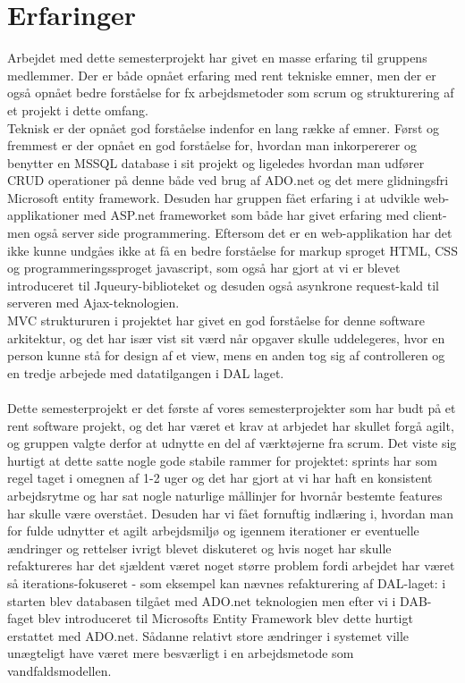 \section{Erfaringer}
Arbejdet med dette semesterprojekt har givet en masse erfaring til gruppens medlemmer. Der er både opnået erfaring med rent tekniske emner, men der er også opnået bedre forståelse for fx arbejdsmetoder som scrum og strukturering af et projekt i dette omfang.\\
Teknisk er der opnået god forståelse indenfor en lang række af emner. Først og fremmest er der opnået en god forståelse for, hvordan man inkorpererer og benytter en MSSQL database i sit projekt og ligeledes hvordan man udfører CRUD operationer på denne både ved brug af ADO.net og det mere glidningsfri Microsoft entity framework. Desuden har gruppen fået erfaring i at udvikle web-applikationer med ASP.net frameworket som både har givet erfaring med client- men også server side programmering. Eftersom det er en web-applikation har det ikke kunne undgåes ikke at få en bedre forståelse for markup sproget HTML, CSS og programmeringssproget javascript, som også har gjort at vi er blevet introduceret til Jqueury-biblioteket og desuden også asynkrone request-kald til serveren med Ajax-teknologien.\\
MVC struktururen i projektet har givet en god forståelse for denne software arkitektur, og det har især vist sit værd når opgaver skulle uddelegeres, hvor en person kunne stå for design af et view, mens en anden tog sig af controlleren og en tredje arbejede med datatilgangen i DAL laget. 
\\
\\
Dette semesterprojekt er det første af vores semesterprojekter som har budt på et rent software projekt, og det har været et krav at arbjedet har skullet forgå agilt, og gruppen valgte derfor at udnytte en del af værktøjerne fra scrum. Det viste sig hurtigt at dette satte nogle gode stabile rammer for projektet: sprints har som regel taget i omegnen af 1-2 uger og det har gjort at vi har haft en konsistent arbejdsrytme og har sat nogle naturlige mållinjer for hvornår bestemte features har skulle være overstået. Desuden har vi fået fornuftig indlæring i, hvordan man for fulde udnytter et agilt arbejdsmiljø og igennem iterationer er eventuelle ændringer og rettelser ivrigt blevet diskuteret og hvis noget har skulle refaktureres har det sjældent været noget større problem fordi arbejdet har været så iterations-fokuseret - som eksempel kan nævnes refakturering af DAL-laget: i starten blev databasen tilgået med ADO.net teknologien men efter vi i DAB-faget blev introduceret til Microsofts Entity Framework blev dette hurtigt erstattet med ADO.net. Sådanne relativt store ændringer i systemet ville unægteligt have været mere besværligt i en arbejdsmetode som vandfaldsmodellen. \\

